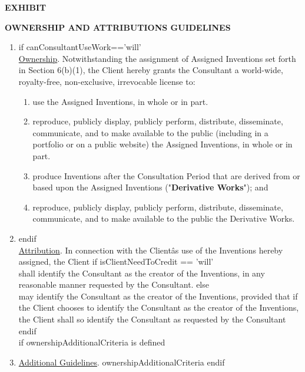 \documentclass[12pt]{article}
\newcommand{\VAR}[1]{{\color{blue}#1}}
\newcommand{\BLOCK}[1]{{\smallskip \color{red}#1 \\ }}
\begin{document}
\begin{center}
\label{exhibitC}
\vspace{1.5cm}
{\huge\bfseries EXHIBIT  \par}
\vspace{1cm}
{\huge\bfseries \uppercase{OWNERSHIP AND ATTRIBUTIONS Guidelines} \par}
\end{center}
\begin{enumerate}
    \item \BLOCK{if canConsultantUseWork=='will'} %
    \underline{Ownership}. Notwithstanding the assignment of Assigned Inventions set forth in Section 6(b)(1), the Client hereby grants the Consultant a world-wide, royalty-free, non-exclusive, irrevocable license to:
    \begin{enumerate}
            \item use the Assigned Inventions, in whole or in part.
            \item reproduce, publicly display, publicly perform, distribute, disseminate, communicate, and to make available to the public (including in a portfolio or on a public website) the Assigned Inventions, in whole or in part.
            \item produce Inventions after the Consultation Period that are derived from or based upon the Assigned Inventions ("{\bf Derivative Works}"); and
            \item reproduce, publicly display, publicly perform, distribute, disseminate, communicate, and to make available to the public the Derivative Works.
    \end{enumerate}
    \item
    \BLOCK{endif}
    \underline{Attribution}. In connection with the Clientâs use of the Inventions hereby assigned, the Client
    \BLOCK{ if isClientNeedToCredit == 'will' }
    shall identify the Consultant as the creator of the Inventions, in any reasonable manner requested by the Consultant.
    \BLOCK{else}
    may identify the Consultant as the creator of the Inventions, provided that if the Client chooses to identify the Consultant as the creator of the Inventions, the Client shall so identify the Consultant as requested by the Consultant
    \BLOCK{endif}
    \BLOCK{if ownershipAdditionalCriteria is defined}
    \item \underline{Additional Guidelines}. \VAR{ownershipAdditionalCriteria}
    \BLOCK{endif}
\end{enumerate}
\end{document}
